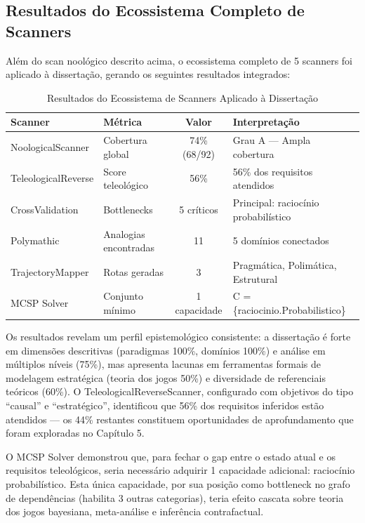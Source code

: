 \subsection{Resultados do Ecossistema Completo de Scanners}

Além do scan noológico descrito acima, o ecossistema completo de 5 scanners foi aplicado à dissertação, gerando os seguintes resultados integrados:

\begin{table}[H]
\centering
\caption{Resultados do Ecossistema de Scanners Aplicado à Dissertação}
\label{tab:scanners-resultados}
\begin{tabular}{p{3cm}p{3cm}cp{3cm}}
\toprule
\textbf{Scanner} & \textbf{Métrica} & \textbf{Valor} & \textbf{Interpretação} \\
\midrule
NoologicalScanner & Cobertura global & 74\% (68/92) & Grau A --- Ampla cobertura \\
TeleologicalReverse & Score teleológico & 56\% & 56\% dos requisitos atendidos \\
CrossValidation & Bottlenecks & 5 críticos & Principal: raciocínio probabilístico \\
Polymathic & Analogias encontradas & 11 & 5 domínios conectados \\
TrajectoryMapper & Rotas geradas & 3 & Pragmática, Polimática, Estrutural \\
MCSP Solver & Conjunto mínimo & 1 capacidade & C = \{raciocinio.Probabilistico\} \\
\bottomrule
\end{tabular}
\end{table}

Os resultados revelam um perfil epistemológico consistente: a dissertação é forte em dimensões descritivas (paradigmas 100\%, domínios 100\%) e análise em múltiplos níveis (75\%), mas apresenta lacunas em ferramentas formais de modelagem estratégica (teoria dos jogos 50\%) e diversidade de referenciais teóricos (60\%). O TeleologicalReverseScanner, configurado com objetivos do tipo ``causal'' e ``estratégico'', identificou que 56\% dos requisitos inferidos estão atendidos --- os 44\% restantes constituem oportunidades de aprofundamento que foram exploradas no Capítulo 5.

O MCSP Solver demonstrou que, para fechar o gap entre o estado atual e os requisitos teleológicos, seria necessário adquirir 1 capacidade adicional: raciocínio probabilístico. Esta única capacidade, por sua posição como bottleneck no grafo de dependências (habilita 3 outras categorias), teria efeito cascata sobre teoria dos jogos bayesiana, meta-análise e inferência contrafactual.

